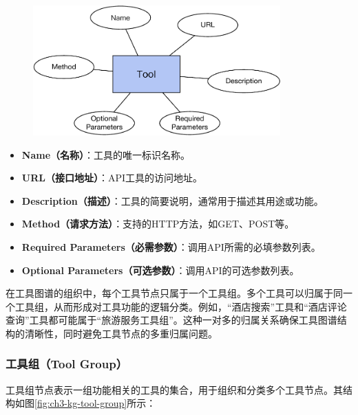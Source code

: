 \begin{figure}[H]
    \vspace{1em}
    \centering
    \setlength{\abovecaptionskip}{10pt} %
    \includegraphics[height=5cm]{../assets/图谱格式-tool.pdf}
    \label{fig:ch3-kg-tool}
\end{figure}

\begin{itemize}
    \item \textbf{Name（名称）}：工具的唯一标识名称。
    \item \textbf{URL（接口地址）}：API工具的访问地址。
    \item \textbf{Description（描述）}：工具的简要说明，通常用于描述其用途或功能。
    \item \textbf{Method（请求方法）}：支持的HTTP方法，如GET、POST等。
    \item \textbf{Required Parameters（必需参数）}：调用API所需的必填参数列表。
    \item \textbf{Optional Parameters（可选参数）}：调用API的可选参数列表。
\end{itemize}

在工具图谱的组织中，每个工具节点只属于一个工具组。多个工具可以归属于同一个工具组，从而形成对工具功能的逻辑分类。例如，“酒店搜索”工具和“酒店评论查询”工具都可能属于“旅游服务工具组”。这种一对多的归属关系确保工具图谱结构的清晰性，同时避免工具节点的多重归属问题。

\subsubsection{工具组（Tool Group）}

工具组节点表示一组功能相关的工具的集合，用于组织和分类多个工具节点。其结构如图\ref{fig:ch3-kg-tool-group}所示：

